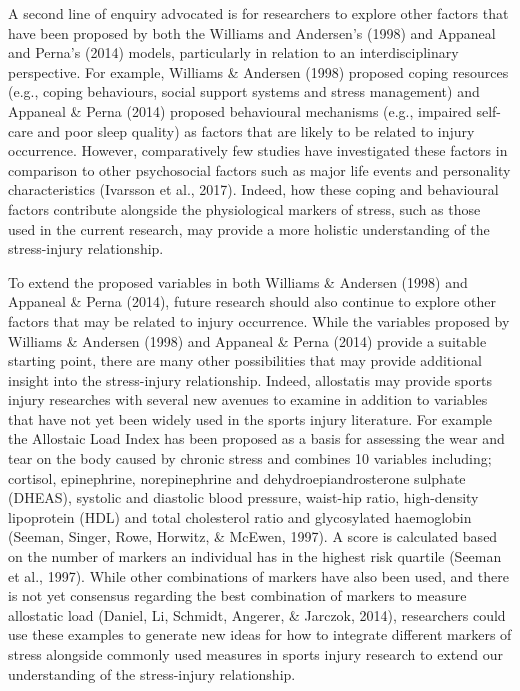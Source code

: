 \documentclass[
  english,
  man,floatsintext]{apa6}
\begin{document}
A second line of enquiry advocated is for researchers to explore other factors that have been proposed by both the Williams and Andersen's (1998) and Appaneal and Perna's (2014) models, particularly in relation to an interdisciplinary perspective.
For example, Williams \& Andersen (1998) proposed coping resources (e.g., coping behaviours, social support systems and stress management) and Appaneal \& Perna (2014) proposed behavioural mechanisms (e.g., impaired self-care and poor sleep quality) as factors that are likely to be related to injury occurrence.
However, comparatively few studies have investigated these factors in comparison to other psychosocial factors such as major life events and personality characteristics (Ivarsson et al., 2017).
Indeed, how these coping and behavioural factors contribute alongside the physiological markers of stress, such as those used in the current research, may provide a more holistic understanding of the stress-injury relationship.

To extend the proposed variables in both Williams \& Andersen (1998) and Appaneal \& Perna (2014), future research should also continue to explore other factors that may be related to injury occurrence.
While the variables proposed by Williams \& Andersen (1998) and Appaneal \& Perna (2014) provide a suitable starting point, there are many other possibilities that may provide additional insight into the stress-injury relationship.
Indeed, allostatis may provide sports injury researches with several new avenues to examine in addition to variables that have not yet been widely used in the sports injury literature.
For example the Allostaic Load Index has been proposed as a basis for assessing the wear and tear on the body caused by chronic stress and combines 10 variables including; cortisol, epinephrine, norepinephrine and dehydroepiandrosterone sulphate (DHEAS), systolic and diastolic blood pressure, waist-hip ratio, high-density lipoprotein (HDL) and total cholesterol ratio and glycosylated haemoglobin (Seeman, Singer, Rowe, Horwitz, \& McEwen, 1997).
A score is calculated based on the number of markers an individual has in the highest risk quartile (Seeman et al., 1997). While other combinations of markers have also been used, and there is not yet consensus regarding the best combination of markers to measure allostatic load (Daniel, Li, Schmidt, Angerer, \& Jarczok, 2014), researchers could use these examples to generate new ideas for how to integrate different markers of stress alongside commonly used measures in sports injury research to extend our understanding of the stress-injury relationship.
\end{document}
